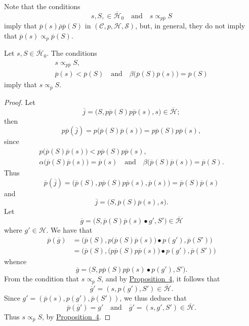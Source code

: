 \documentclass[a4paper,fleqn]{article}
\theoremstyle{plain}
\newenvironment{proposition}[1]
  {\renewcommand\theinnerproposition{#1}\innerproposition}
  {\endinnerproposition}
\theoremstyle{definition}
\newcommand{\textand}{\quad\text{and}\quad}
\newcommand{\CC}{\mathcal{C}}
\newcommand{\HH}{\mathcal{H}}
\newcommand{\bHH}{\overline{\HH}}
\renewcommand{\SS}{\mathcal{S}}
\newcommand{\relrhobar}{\mathrel{\overline{\rho}}}
\newcommand{\subs}{\mathrel{\propto}}
\begin{document}
Note that the conditions
\[
  s,S,\in\bHH_0
  \textand
  s\subs_{p\overline{p}} S
\]
imply that $\overline{p}(s)\relrhobar\overline{p}(S)$ in $(\CC,p,\HH,\SS)$, but, in general, they do not imply that $\overline{p}(s)\subs_p\overline{p}(S)$.

\begin{proposition}{12}
\label{proposition:i-12}
  Let $s,S\in\bHH_0$.
  The conditions
  \[
    \begin{gathered}
      s\subs_{p\overline{p}}S,
    \\\overline{p}(s)<\overline{p}(S)
      \textand
      \beta\big(\overline{p}(S)\overline{p}(s)\big) = \overline{p}(S)
    \end{gathered}
  \]
  imply that $s\subs_{\overline{p}}S$.
\end{proposition}

\begin{proof}
  Let
  \[
    \overline{j}
    = \big(
      S, p\overline{p}(S)p\overline{p}(s), s
    \big) \in \bHH;
  \]
  then
  \[
    p\overline{p}(\overline{j})
    = p\big(
      \overline{p}(S)\overline{p}(s)
    \big)
    = p\overline{p}(S)p\overline{p}(s),
  \]
  since
  \[
    \begin{gathered}
      p\big(
        \overline{p}(S)\overline{p}(s)
      \big) < p\overline{p}(S)p\overline{p}(s),
    \\\alpha\big(
        \overline{p}(S)\overline{p}(s)
      \big) = \overline{p}(s)
      \textand
      \beta\big(
        \overline{p}(S)\overline{p}(s)
      \big) = \overline{p}(S).
    \end{gathered}
  \]
  Thus
  \[
    \overline{p}(\overline{j})
    = \big(
      \overline{p}(S), p\overline{p}(S)p\overline{p}(s), \overline{p}(s)
    \big)
    = \overline{p}(S)\overline{p}(s)
  \]
  and
  \[
    \overline{j}
    =\big(
      S, \overline{p}(S)\overline{p}(s), s
    \big).
  \]
  Let
  \[
    \overline{g}
    = \big(
      S, \overline{p}(S)\overline{p}(s)\bullet g', S'
    \big) \in\bHH
  \]
  where $g'\in\HH$.
  We have that
  \[
    \begin{aligned}
      \overline{p}(\overline{g})
      &= \big(
        \overline{p}(S),
        p\big(\overline{p}(S)\overline{p}(s)\big)\bullet p(g'),
        \overline{p}(S')
      \big)
    \\&= \big(
        \overline{p}(S),
        \big(p\overline{p}(S)p\overline{p}(s)\big)\bullet p(g'),
        \overline{p}(S')
      \big)
    \end{aligned}
  \]
  whence
  \[
    \overline{g}
    = \big(
      S, p\overline{p}(S)p\overline{p}(s)\bullet p(g'), S'
    \big).
  \]
  From the condition that $s\subs_{\overline{p}}S$, and by \hyperref[proposition:i-4]{Proposition~4}, it follows that
  \[
    \overline{g}'
    = (s, p(g'), S')
    \in\bHH.
  \]
  Since $g'=(\overline{p}(s),p(g'),\overline{p}(S'))$, we thus deduce that
  \[
    \overline{p}(\overline{g}') = g'
    \textand
    \overline{g}' = (s,g',S') \in \bHH.
  \]
  Thus $s\subs_{\overline{p}}S$, by \hyperref[proposition:i-4]{Proposition~4}.
\end{proof}
\end{document}
